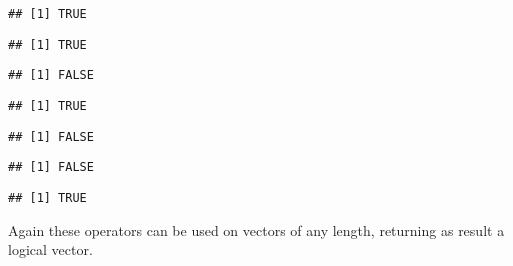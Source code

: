\documentclass[paper=a4,headsepline,BCOR=12mm,twoside,open=right,%
titlepage,headings=small,fontsize=10pt,index=totoc,bibliography=totoc,%
captions=tableheading,captions=nooneline]{scrbook}\usepackage{knitr}
\begin{document}
\begin{knitrout}\footnotesize
{}\color{fgcolor}\begin{kframe}
\begin{alltt}
 \hlopt{>} 
\end{alltt}
\begin{verbatim}
## [1] TRUE
\end{verbatim}
\begin{alltt}
 \hlopt{>=} 
\end{alltt}
\begin{verbatim}
## [1] TRUE
\end{verbatim}
\begin{alltt}
 \hlopt{==}  
\end{alltt}
\begin{verbatim}
## [1] FALSE
\end{verbatim}
\begin{alltt}
 \hlopt{!=} 
\end{alltt}
\begin{verbatim}
## [1] TRUE
\end{verbatim}
\begin{alltt}
 \hlopt{<=} 
\end{alltt}
\begin{verbatim}
## [1] FALSE
\end{verbatim}
\begin{alltt}
 \hlopt{<} 
\end{alltt}
\begin{verbatim}
## [1] FALSE
\end{verbatim}
\begin{alltt}
 \hlkwb{<-} 
 \hlopt{<}  \hlopt{&&}  \hlopt{>} 
\end{alltt}
\begin{verbatim}
## [1] TRUE
\end{verbatim}
\end{kframe}
\end{knitrout}

Again these operators can be used on vectors of any length, returning as result a logical vector.
\end{document}
